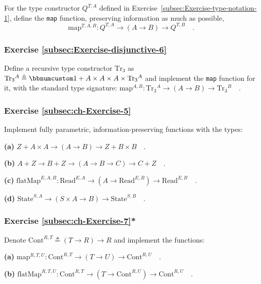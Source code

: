 For the type constructor $Q^{T,A}$ defined in Exercise~\ref{subsec:Exercise-type-notation-1},
define the \lstinline!map! function, preserving information as much
as possible,
\[
\text{map}^{T,A,B}:Q^{T,A}\rightarrow\left(A\rightarrow B\right)\rightarrow Q^{T,B}\quad.
\]


\subsubsection{Exercise \label{subsec:Exercise-disjunctive-6}\ref{subsec:Exercise-disjunctive-6}}

Define a recursive type constructor $\text{Tr}_{3}$ as $\text{Tr}_{3}{}^{A}\triangleq\bbnum 1+A\times A\times A\times\text{Tr}_{3}{}^{A}$
and implement the \lstinline!map! function for it, with the standard
type signature: $\text{map}^{A,B}:\text{Tr}_{3}{}^{A}\rightarrow\left(A\rightarrow B\right)\rightarrow\text{Tr}_{3}{}^{B}\quad.$

\subsubsection{Exercise \label{subsec:ch-Exercise-5}\ref{subsec:ch-Exercise-5}}

Implement fully parametric, information-preserving functions with
the types:

\textbf{(a)} $Z+A\times A\rightarrow(A\rightarrow B)\rightarrow Z+B\times B\quad.$

\textbf{(b)} $A+Z\rightarrow B+Z\rightarrow(A\rightarrow B\rightarrow C)\rightarrow C+Z\quad.$

\textbf{(c)} $\text{flatMap}^{E,A,B}:\text{Read}^{E,A}\rightarrow(A\rightarrow\text{Read}^{E,B})\rightarrow\text{Read}^{E,B}\quad.$

\textbf{(d)} $\text{State}^{S,A}\rightarrow\left(S\times A\rightarrow B\right)\rightarrow\text{State}^{S,B}\quad.$

\subsubsection{Exercise \label{subsec:ch-Exercise-7}\ref{subsec:ch-Exercise-7}{*}}

Denote $\text{Cont}^{R,T}\triangleq\left(T\rightarrow R\right)\rightarrow R$
and implement the functions:

\textbf{(a)} $\text{map}^{R,T,U}:\text{Cont}^{R,T}\rightarrow(T\rightarrow U)\rightarrow\text{Cont}^{R,U}\quad.$

\textbf{(b)} $\text{flatMap}^{R,T,U}:\text{Cont}^{R,T}\rightarrow(T\rightarrow\text{Cont}^{R,U})\rightarrow\text{Cont}^{R,U}\quad.$

